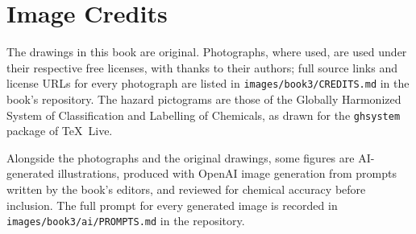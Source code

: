 \chapter*{Image Credits}

The drawings in this book are original. Photographs, where used, are used
under their respective free licenses, with thanks to their authors; full
source links and license URLs for every photograph are listed in
\texttt{images/book3/CREDITS.md} in the book's repository.
The hazard pictograms are those of the Globally Harmonized System of
Classification and Labelling of Chemicals, as drawn for the
\texttt{ghsystem} package of \TeX\ Live.

\bigskip
Alongside the photographs and the original drawings, some figures are
AI-generated illustrations, produced with OpenAI image generation from
prompts written by the book's editors, and reviewed for chemical
accuracy before inclusion. The full prompt for every generated image is
recorded in \texttt{images/book3/ai/PROMPTS.md} in the repository.

